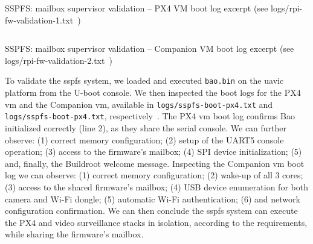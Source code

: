 \begin{longlisting}
\centering
\inputminted[]{kconfig}{./listing/rpi-fw-validation-1.txt}
\caption[SSPFS: mailbox supervisor validation -- PX4 VM boot log
(excerpt)]{SSPFS: mailbox supervisor validation -- PX4 VM boot log excerpt (see logs/rpi-fw-validation-1.txt~\cite{thesis-sw-github})}
\label{lst:rpi-fw-validation-1}
\end{longlisting}

\begin{longlisting}
\centering
\inputminted[]{kconfig}{./listing/rpi-fw-validation-2.txt}
\caption[SSPFS: mailbox supervisor validation -- Companion VM boot log
(excerpt)]{SSPFS: mailbox supervisor validation -- Companion VM boot log excerpt (see logs/rpi-fw-validation-2.txt~\cite{thesis-sw-github})}
\label{lst:rpi-fw-validation-2}
\end{longlisting}

To validate the \gls{sspfs} system, we loaded and executed \lstinline{bao.bin}
on the \gls{uavic} platform from the U-boot console.
We then inspected the boot logs for the PX4 \gls{vm} and the Companion \gls{vm},
available in \lstinline{logs/sspfs-boot-px4.txt} and
\lstinline{logs/sspfs-boot-px4.txt}, respectively~\cite{thesis-sw-github}.
The PX4 \gls{vm} boot log confirms Bao initialized correctly (line 2), as they
share the serial console. We can further observe: (1) correct memory
configuration; (2) setup of the UART5 console operation; (3) access to the
firmware's mailbox; (4) SPI device initialization; (5) and, finally, the Buildroot
welcome message. Inspecting the Companion \gls{vm} boot log we can observe: (1)
correct memory configuration; (2) wake-up of all 3 cores; (3) access to the
shared firmware's mailbox; (4) USB device enumeration for both camera and Wi-Fi
dongle; (5) automatic Wi-Fi authentication; (6) and network configuration
confirmation. We can then conclude the \gls{sspfs} system can execute the PX4
and video surveillance stacks in isolation, according to the requirements, while
sharing the firmware's mailbox.

